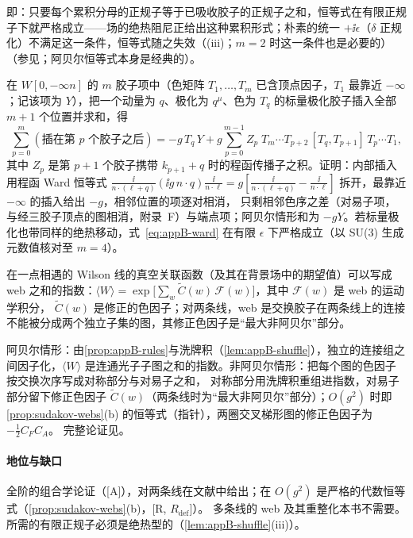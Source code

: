 即：只要每个累积分母的正规子等于已吸收胶子的正规子之和，恒等式在有限正规子下就严格成立——场的绝热阻尼正给出这种累积形式；朴素的统一 $+\ii\epsilon$（$\delta$ 正规化）不满足这一条件，恒等式随之失效（(iii)；$m=2$ 时这一条件也是必要的）
（参见\cite[式~(5)--(6)]{Echevarria:2015byo}；阿贝尔恒等式本身是经典的）。

\begin{remark}\label{rem:appB-ward}
在 $W[0,-\infty n]$ 的 $m$ 胶子项中（色矩阵 $T_1,\dots,T_m$ 已含顶点因子，$T_1$ 最靠近 $-\infty$；记该项为 $Y$），把一个动量为 $q$、极化为 $q^\mu$、色为 $T_q$ 的标量极化胶子插入全部 $m+1$ 个位置并求和，得
\begin{equation}\label{eq:appB-ward}
\sum_{p=0}^{m}(\text{插在第 }p\text{ 个胶子之后})=-g\,T_q\,Y+g\sum_{p=0}^{m-1}Z_p\;T_m\cdots T_{p+2}\,[T_q,T_{p+1}]\,T_p\cdots T_1 ,
\end{equation}
其中 $Z_p$ 是第 $p+1$ 个胶子携带 $k_{p+1}+q$ 时的程函传播子之积。证明：内部插入用程函 Ward 恒等式
$\frac{\ii}{n\cdot(\ell+q)}(\ii g\,n\cdot q)\frac{\ii}{n\cdot\ell}=g[\frac{\ii}{n\cdot(\ell+q)}-\frac{\ii}{n\cdot\ell}]$ 拆开，最靠近 $-\infty$ 的插入给出 $-g$，相邻位置的项逐对相消，
只剩相邻色序之差（对易子项，与经三胶子顶点的图相消，附录~F）与端点项；阿贝尔情形和为 $-gY$。若标量极化也带同样的绝热移动，式~\eqref{eq:appB-ward} 在有限 $\epsilon$ 下严格成立（以 SU(3) 生成元数值核对至 $m=4$）。%
\end{remark}

\begin{proposition}\label{prop:appB-webs}
在一点相遇的 Wilson 线的真空关联函数（及其在背景场中的期望值）可以写成 web 之和的指数：$\langle W\rangle=\exp\big[\sum_w\tilde C(w)\,\mathcal F(w)\big]$，其中 $\mathcal F(w)$ 是 web 的运动学积分，
$\tilde C(w)$ 是修正的色因子；对两条线，web 是交换胶子在两条线上的连接不能被分成两个独立子集的图，其修正色因子是“最大非阿贝尔”部分\cite{Gatheral1983,FrenkelTaylor1984}。
\end{proposition}

\begin{proofsketch}
阿贝尔情形：由\cref{prop:appB-rules}与洗牌积（\cref{lem:appB-shuffle}），独立的连接组之间因子化，$\langle W\rangle$ 是连通光子子图之和的指数。非阿贝尔情形：把每个图的色因子按交换次序写成对称部分与对易子之和，
对称部分用洗牌积重组进指数，对易子部分留下修正色因子 $\tilde C(w)$（两条线时为“最大非阿贝尔”部分）；$O(g^2)$ 时即\cref{prop:sudakov-webs}(b) 的恒等式（指针），两圈交叉梯形图的修正色因子为 $-\frac12C_FC_A$。
完整论证见\cite{Gatheral1983,FrenkelTaylor1984}。
\end{proofsketch}

\paragraph{地位与缺口}全阶的组合学论证（[A]），对两条线在文献中给出\cite{Gatheral1983,FrenkelTaylor1984}；在 $O(g^2)$ 是严格的代数恒等式（\cref{prop:sudakov-webs}(b)，[R, $R_{\mathrm{def}}$]）。
多条线的 web 及其重整化本书不需要。所需的有限正规子必须是绝热型的（\cref{lem:appB-shuffle}(iii)）。
